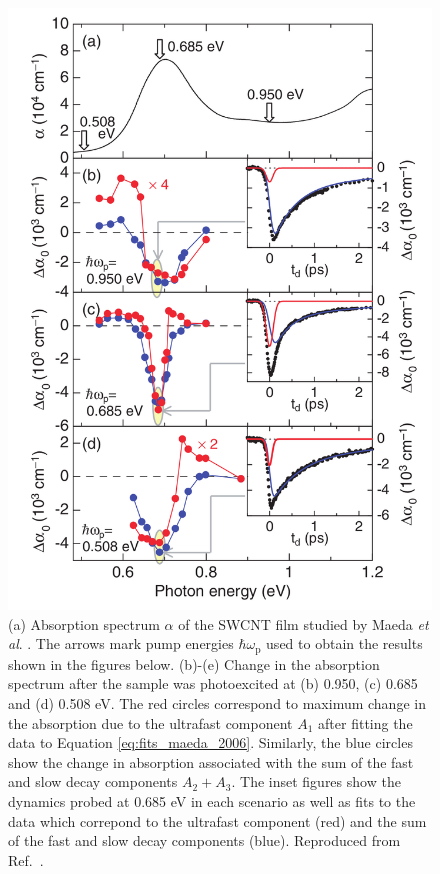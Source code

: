\begin{figure}[H]
	\centering
	\includegraphics[scale=0.18]{images/chapter_prior_works/dtt_maeda_2006}
	\caption{(a) Absorption spectrum $\alpha$ of the SWCNT film studied by Maeda \textit{et al}. \cite{maeda2006gigantic}. The arrows mark pump energies $\hbar \omega_\text{p}$ used to obtain the results shown in the figures below. (b)-(e) Change in the absorption spectrum after the sample was photoexcited at (b) 0.950, (c) 0.685 and (d) 0.508 eV. The red circles correspond to maximum change in the absorption due to the ultrafast component $A_1$ after fitting the data to Equation \eqref{eq:fits_maeda_2006}. Similarly, the blue circles show the change in absorption associated with the sum of the fast and slow decay components $A_2 + A_3$. The inset figures show the dynamics probed at 0.685 eV in each scenario as well as fits to the data which correpond to the ultrafast component (red) and the sum of the fast and slow decay components (blue). Reproduced from Ref.\ \cite{maeda2006gigantic}.}
	\label{fig:dtt_maeda_2006}
\end{figure}


